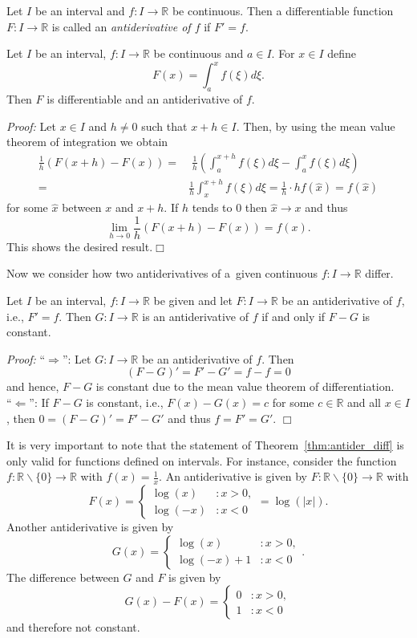 

\begin{Definition}{}
Let $I$ be an interval and $f:I\to\mathbb{R}$ be continuous. Then a
differentiable function $F:I \to\mathbb{R}$ is called an \emph{antiderivative of $f$} if $F'=f$.
\end{Definition}

\begin{Theorem}{}
\label{thm:antider}
Let $I$ be an interval, $f:I\to\mathbb{R}$ be continuous and $a\in I$. For $x\in I$ define
\[F(x)=\int_a^xf(\xi)d\xi.\]
Then $F$ is differentiable and an antiderivative of $f$.
\end{Theorem}
{\em Proof:} Let $x\in I$ and $h\neq0$ such that $x+h\in I$. Then, by using the mean value theorem of integration we obtain
\[
\begin{aligned}
\frac1h \left(F(x+h)-F(x)\right)=&\;\frac1h\left(\int_a^{x+h}f(\xi)d\xi-\int_a^xf(\xi)d\xi\right)\\
=&\frac1h\int_x^{x+h}f(\xi)d\xi=\frac1h\cdot h f(\hat{x})=f(\hat{x})
\end{aligned}
\]
for some $\hat{x}$ between $x$ and $x+h$. If $h$ tends to $0$ then $\hat{x}\to x$ and thus
\[\lim_{h\to0}\frac1h \left(F(x+h)-F(x)\right)=f(x).\]
This shows the desired result.$\Box$

Now we consider how two antiderivatives of a~given continuous $f:I\to\mathbb{R}$ differ.
\begin{Theorem}{}\label{thm:antider_diff}
Let $I$ be an interval, $f:I\to\mathbb{R}$ be given and let $F:I\to\mathbb{R}$ be an antiderivative of $f$, i.e., $F'=f$. Then $G:I\to\mathbb{R}$ is an antiderivative of $f$ if and only if $F-G$ is constant.
\end{Theorem}
{\em Proof:}
``$\Rightarrow$'': Let $G:I\to\mathbb{R}$ be an antiderivative of $f$. Then \[(F-G)'=F'-G'=f-f=0\] and hence, $F-G$ is constant due to the mean value theorem of differentiation.\\
``$\Leftarrow$'': If $F-G$ is constant, i.e.,  $F(x)-G(x)=c$ for some $c\in\mathbb{R}$ and all $x\in I$, then $0=(F-G)'=F'-G'$ and thus $f=F'=G'$.
$\Box$


\begin{Remark}{}
It is very important to note that the statement of Theorem~\ref{thm:antider_diff} is only valid for functions defined on intervals. For instance, consider the function $f:\mathbb{R}\backslash\{0\}\to\mathbb{R}$ with $f(x)=\frac1x$. An antiderivative is given by
$F:\mathbb{R}\backslash\{0\}\to\mathbb{R}$ with
\[F(x)=\begin{cases}\log(x)&:x>0,\\\log(-x)&:x<0\end{cases}=\log(|x|).\]
Another antiderivative is given by
\[G(x)=\begin{cases}\log(x)&:x>0,\\\log(-x)+1&:x<0\end{cases}.\]
The difference between $G$ and $F$ is given by
\[G(x)-F(x)=\begin{cases}0&:x>0,\\1&:x<0\end{cases}\]
and therefore not constant.
\end{Remark}
